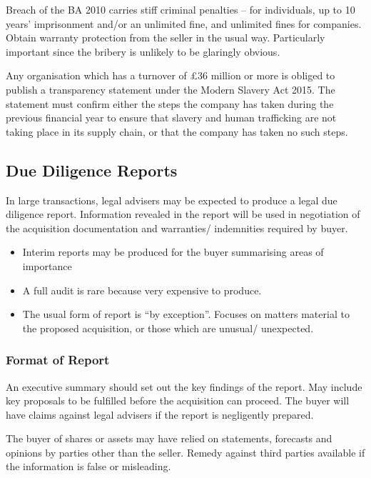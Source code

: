 \documentclass[
]{article}
\providecommand{\tightlist}{%
  \setlength{\itemsep}{0pt}\setlength{\parskip}{0pt}}
\begin{document}
Breach of the BA 2010 carries stiff criminal penalties -- for
individuals, up to 10 years' imprisonment and/or an unlimited fine, and
unlimited fines for companies. Obtain warranty protection from the
seller in the usual way. Particularly important since the bribery is
unlikely to be glaringly obvious.

Any organisation which has a turnover of £36 million or more is obliged
to publish a transparency statement under the Modern Slavery Act 2015.
The statement must confirm either the steps the company has taken during
the previous financial year to ensure that slavery and human trafficking
are not taking place in its supply chain, or that the company has taken
no such steps.

\hypertarget{due-diligence-reports}{%
\subsection{Due Diligence Reports}\label{due-diligence-reports}}

In large transactions, legal advisers may be expected to produce a legal
due diligence report. Information revealed in the report will be used in
negotiation of the acquisition documentation and warranties/ indemnities
required by buyer.

\begin{itemize}
\tightlist
\item
  Interim reports may be produced for the buyer summarising areas of
  importance
\item
  A full audit is rare because very expensive to produce.
\item
  The usual form of report is ``by exception''. Focuses on matters
  material to the proposed acquisition, or those which are unusual/
  unexpected.
\end{itemize}

\hypertarget{format-of-report}{%
\subsubsection{Format of Report}\label{format-of-report}}

An executive summary should set out the key findings of the report. May
include key proposals to be fulfilled before the acquisition can
proceed. The buyer will have claims against legal advisers if the report
is negligently prepared.

The buyer of shares or assets may have relied on statements, forecasts
and opinions by parties other than the seller. Remedy against third
parties available if the information is false or misleading.
\end{document}
